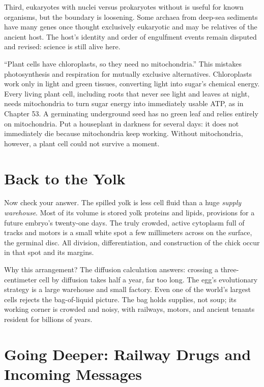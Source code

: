 Third, eukaryotes with nuclei versus prokaryotes without is useful for known organisms, but the boundary is loosening. Some archaea from deep-sea sediments have many genes once thought exclusively eukaryotic and may be relatives of the ancient host. The host's identity and order of engulfment events remain disputed and revised: science is still alive here.

\begin{wuqu}
``Plant cells have chloroplasts, so they need no mitochondria.'' This mistakes photosynthesis and respiration for mutually exclusive alternatives. Chloroplasts work only in light and green tissues, converting light into sugar's chemical energy. Every living plant cell, including roots that never see light and leaves at night, needs mitochondria to turn sugar energy into immediately usable ATP, as in Chapter 53. A germinating underground seed has no green leaf and relies entirely on mitochondria. Put a houseplant in darkness for several days: it does not immediately die because mitochondria keep working. Without mitochondria, however, a plant cell could not survive a moment.
\end{wuqu}

\section{Back to the Yolk}

Now check your answer. The spilled yolk is less cell fluid than a huge \emph{supply warehouse}. Most of its volume is stored yolk proteins and lipids, provisions for a future embryo's twenty-one days. The truly crowded, active cytoplasm full of tracks and motors is a small white spot a few millimeters across on the surface, the germinal disc. All division, differentiation, and construction of the chick occur in that spot and its margins.

Why this arrangement? The diffusion calculation answers: crossing a three-centimeter cell by diffusion takes half a year, far too long. The egg's evolutionary strategy is a large warehouse and small factory. Even one of the world's largest cells rejects the bag-of-liquid picture. The bag holds supplies, not soup; its working corner is crowded and noisy, with railways, motors, and ancient tenants resident for billions of years.

\section{Going Deeper: Railway Drugs and Incoming Messages}

